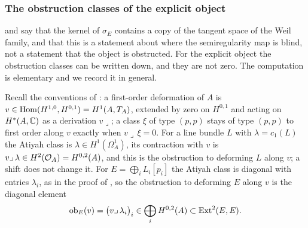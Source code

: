\subsubsection*{The obstruction classes of the explicit object}

 and  say that the kernel of
$\sigma_{E}$ contains a copy of the tangent space of the Weil family, and
that this is a statement about where the semiregularity map is blind, not a
statement that the object is obstructed. For the explicit object the
obstruction classes can be written down, and they are not zero. The
computation is elementary and we record it in general.

Recall the conventions of : a first-order deformation of
$A$ is $v\in\operatorname{Hom}(H^{1,0},H^{0,1})=H^{1}(A,T_{A})$, extended by zero on
$H^{0,1}$ and acting on $H^{*}(A,\mathbb{C})$ as a derivation $v\lrcorner$; a class
$\xi$ of type $(p,p)$ stays of type $(p,p)$ to first order along $v$ exactly
when $v\lrcorner\,\xi=0$. For a line bundle $L$ with $\lambda=c_{1}(L)$ the
Atiyah class is $\lambda\in H^{1}(\Omega^{1}_{A})$, its contraction with $v$
is $v\lrcorner\,\lambda\in H^{2}(\mathcal{O}_{A})=H^{0,2}(A)$, and this is the
obstruction to deforming $L$ along $v$; a shift does not change it. For
$E=\bigoplus_{i}L_{i}[p_{i}]$ the Atiyah class is diagonal with entries
$\lambda_{i}$, as in the proof of , so the
obstruction to deforming $E$ along $v$ is the diagonal element
\begin{equation}\label{eq:obdef}
  \operatorname{ob}_{E}(v)=\bigl(v\lrcorner\,\lambda_{i}\bigr)_{i}
  \in\bigoplus_{i}H^{0,2}(A)\subset\operatorname{Ext}^{2}(E,E).
\end{equation}

